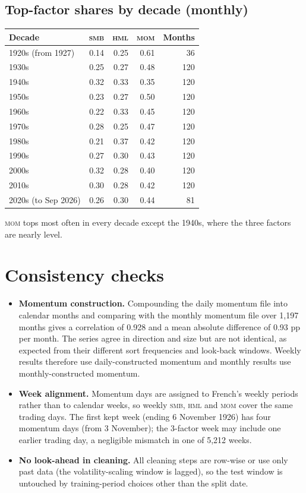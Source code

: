 \documentclass[11pt]{article}
\newcommand{\SMB}{\textsc{smb}}
\newcommand{\HML}{\textsc{hml}}
\newcommand{\MOM}{\textsc{mom}}
\begin{document}
\subsection{Top-factor shares by decade (monthly)}
\begin{center}
\begin{tabular}{lrrrr}
\toprule
Decade & \SMB & \HML & \MOM & Months \\
\midrule
1920s (from 1927) & 0.14 & 0.25 & 0.61 & 36 \\
1930s & 0.25 & 0.27 & 0.48 & 120 \\
1940s & 0.32 & 0.33 & 0.35 & 120 \\
1950s & 0.23 & 0.27 & 0.50 & 120 \\
1960s & 0.22 & 0.33 & 0.45 & 120 \\
1970s & 0.28 & 0.25 & 0.47 & 120 \\
1980s & 0.21 & 0.37 & 0.42 & 120 \\
1990s & 0.27 & 0.30 & 0.43 & 120 \\
2000s & 0.32 & 0.28 & 0.40 & 120 \\
2010s & 0.30 & 0.28 & 0.42 & 120 \\
2020s (to Sep 2026) & 0.26 & 0.30 & 0.44 & 81 \\
\bottomrule
\end{tabular}
\end{center}
\MOM{} tops most often in every decade except the 1940s, where the three factors are nearly level.

\section{Consistency checks}\label{sec:checks}
\sloppy

\begin{itemize}
\item \textbf{Momentum construction.} Compounding the daily momentum file into calendar months and comparing with the monthly momentum file over 1{,}197 months gives a correlation of 0.928 and a mean absolute difference of 0.93 pp per month. The series agree in direction and size but are not identical, as expected from their different sort frequencies and look-back windows. Weekly results therefore use daily-constructed momentum and monthly results use monthly-constructed momentum.
\item \textbf{Week alignment.} Momentum days are assigned to French's weekly periods rather than to calendar weeks, so weekly \SMB, \HML{} and \MOM{} cover the same trading days. The first kept week (ending 6 November 1926) has four momentum days (from 3 November); the 3-factor week may include one earlier trading day, a negligible mismatch in one of 5{,}212 weeks.
\item \textbf{No look-ahead in cleaning.} All cleaning steps are row-wise or use only past data (the volatility-scaling window is lagged), so the test window is untouched by training-period choices other than the split date.
\end{itemize}
\end{document}
